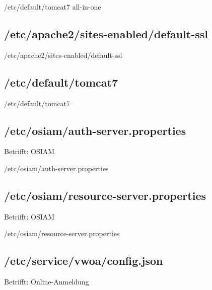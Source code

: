 \begin{lstdump}{/etc/default/tomcat7 all-in-one}
\end{lstdump}

\else%

\subsection{/etc/apache2/sites-enabled/default-ssl}\label{subsec:refcfg-apache-defssl}

\begin{lstdump}{/etc/apache2/sites-enabled/default-ssl}
\end{lstdump}

\subsection{/etc/default/tomcat7}\label{subsec:refcfg-tcdef}

\begin{lstdump}{/etc/default/tomcat7}
\end{lstdump}

\fi%
\ifoa

\subsection{/etc/osiam/auth-server.properties}\label{subsec:refcfg-osiam-auth}

Betrifft: OSIAM

\begin{lstdump}{/etc/osiam/auth-server.properties}
\end{lstdump}

\subsection{/etc/osiam/resource-server.properties}\label{subsec:refcfg-osiam-rsrc}

Betrifft: OSIAM

\begin{lstdump}{/etc/osiam/resource-server.properties}
\end{lstdump}

\subsection{/etc/service/vwoa/config.json}\label{subsec:refcfg-oa-cfg}

Betrifft: Online-Anmeldung

